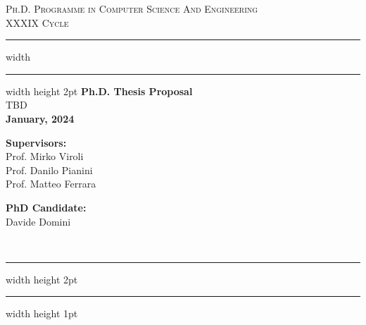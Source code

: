 \documentclass[12pt]{article}
\begin{document}
\begin{titlepage}

	\newcommand{\HRule}{\rule{\linewidth}{0.5mm}}
	\center
	
	\textsc{\Large Ph.D. Programme in Computer Science And Engineering}\\[0.5cm]
	
	\textsc{\Large XXXIX Cycle}\\[0.6cm]
	
	\hrule width \hsize \kern 1mm \hrule width \hsize height 2pt 
	\vspace{0.8cm}
	{ \large \bfseries Ph.D. Thesis Proposal}\\[0.6cm]
	{ \large TBD }\\[0.6cm]





	\bfseries{January, 2024}


    \vspace{1.5cm}
    
    \noindent
    \begin{minipage}[t]{0.45\textwidth}
        \raggedright
        \textbf{Supervisors:}\\[0.5cm]
        Prof. Mirko Viroli\\
        Prof. Danilo Pianini\\
        Prof. Matteo Ferrara
    \end{minipage}%
    \hfill
    \begin{minipage}[t]{0.45\textwidth}
        \raggedleft
        \textbf{PhD Candidate:}\\[0.5cm]
        Davide Domini
    \end{minipage} \\[0.6cm]
	

	\hrule width \hsize height 2pt \kern 1mm \hrule width \hsize height 1pt
	\vspace{0.4cm}
	
\end{titlepage}
\end{document}
